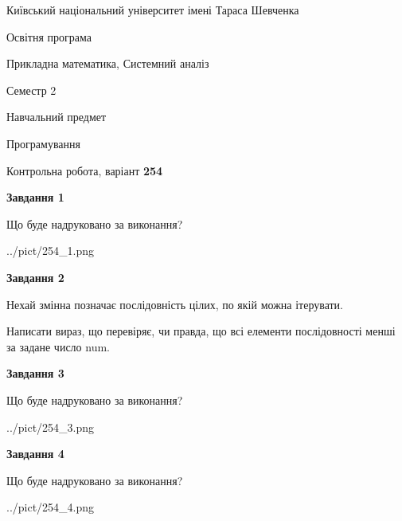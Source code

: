 \documentclass[12pt, ukrainian]{article}
\begin{document}
{{\begin {small}\par
{ \center  Київський національний університет імені Тараса Шевченка \par}
{\parbox {5 cm}{Освітня програма \hfill}{\parbox {8 cm}{Прикладна математика, Системний аналіз \hfill}}\parbox {5 cm}{\hfill Семестр 2}}\par
{\parbox {5 cm} {Навчальний предмет \hfill}\parbox {7 cm}{Програмування \hfill}\parbox {6cm}{\hfill}\par}\vspace{-7pt} \end{small}}{\center Контрольна робота, варіант  \No \textbf
{ 254 }\par}}
{
\begin {large}
{\begin {center}\textbf{Завдання 1}\end {center}}\par
Що буде надруковано за виконання?\par\par
\begin{center}
	{../pict/254_1.png}
\end{center}
\newpage

{\begin {center}\textbf{Завдання 2}\end {center}}\par
Нехай змінна  позначає послідовність цілих, по якій можна ітерувати.

Написати вираз, що перевіряє, чи правда, що всі елементи послідовності менші за задане число num.\par
\newpage

{\begin {center}\textbf{Завдання 3}\end {center}}\par
Що буде надруковано за виконання?\par
\begin{center}
	{../pict/254_3.png}
\end{center}
\newpage

{\begin {center}\textbf{Завдання 4}\end {center}}\par
Що буде надруковано за виконання?\par
\begin{center}
	{../pict/254_4.png}
\end{center}
\newpage


\end{large}}
\end{document}
